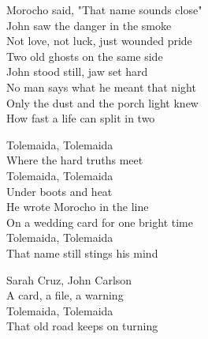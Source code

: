 \begin{lyrics}
Morocho said, "That name sounds close"\\
John saw the danger in the smoke\\
Not love, not luck, just wounded pride\\
Two old ghosts on the same side\\
John stood still, jaw set hard\\
No man says what he meant that night\\
Only the dust and the porch light knew\\
How fast a life can split in two

Tolemaida, Tolemaida\\
Where the hard truths meet\\
Tolemaida, Tolemaida\\
Under boots and heat\\
He wrote Morocho in the line\\
On a wedding card for one bright time\\
Tolemaida, Tolemaida\\
That name still stings his mind

Sarah Cruz, John Carlson\\
A card, a file, a warning\\
Tolemaida, Tolemaida\\
That old road keeps on turning

\end{lyrics}

